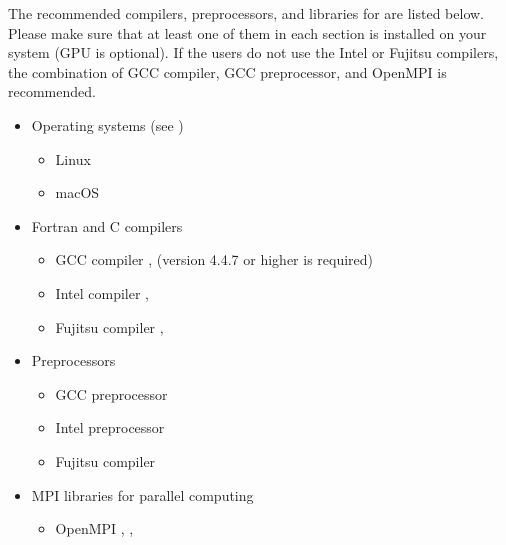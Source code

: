 \documentclass[a4paper,11pt,oneside,english]{sphinxmanual}
\begin{document}
The recommended compilers, preprocessors, and libraries for  are listed below.
Please make sure that at least one of them in each section is installed on your system (GPU is optional).
If the users do not use the Intel or Fujitsu compilers,
the combination of GCC compiler, GCC preprocessor, and OpenMPI is recommended.
\begin{itemize}
\item {} 
Operating systems (see {\hyperref[\detokenize{98_Appendix:appendix}]{}})
\begin{itemize}
\item {} 
Linux

\item {} 
macOS

\end{itemize}

\item {} 
Fortran and C compilers
\begin{itemize}
\item {} 
GCC compiler ,  (version 4.4.7 or higher is required)

\item {} 
Intel compiler , 

\item {} 
Fujitsu compiler , 

\end{itemize}

\item {} 
Preprocessors
\begin{itemize}
\item {} 
GCC preprocessor 

\item {} 
Intel preprocessor 

\item {} 
Fujitsu compiler 

\end{itemize}

\item {} 
MPI libraries for parallel computing
\begin{itemize}
\item {} 
OpenMPI , , 


\end{itemize}
\end{itemize}
\end{document}
